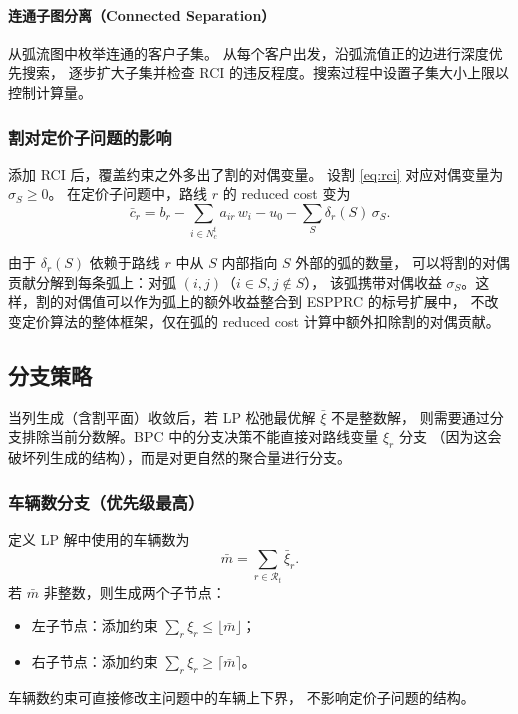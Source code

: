 \documentclass{article}
\begin{document}
\paragraph{连通子图分离（Connected Separation）}
从弧流图中枚举连通的客户子集。
从每个客户出发，沿弧流值正的边进行深度优先搜索，
逐步扩大子集并检查 RCI 的违反程度。搜索过程中设置子集大小上限以控制计算量。

\subsubsection{割对定价子问题的影响}

添加 RCI 后，覆盖约束之外多出了割的对偶变量。
设割 \eqref{eq:rci} 对应对偶变量为 $\sigma_S \ge 0$。
在定价子问题中，路线 $r$ 的 reduced cost 变为
\begin{equation}
\bar{c}_r = b_r - \sum_{i \in N_c^t} a_{ir}\,w_i - u_0 - \sum_{S} \delta_r(S)\,\sigma_S.
\label{eq:reduced_cost_with_cuts}
\end{equation}

由于 $\delta_r(S)$ 依赖于路线 $r$ 中从 $S$ 内部指向 $S$ 外部的弧的数量，
可以将割的对偶贡献分解到每条弧上：对弧 $(i,j)$（$i \in S, j \notin S$），
该弧携带对偶收益 $\sigma_S$。这样，割的对偶值可以作为弧上的额外收益整合到 ESPPRC 的标号扩展中，
不改变定价算法的整体框架，仅在弧的 reduced cost 计算中额外扣除割的对偶贡献。

\subsection{分支策略}
\label{sec:branching}

当列生成（含割平面）收敛后，若 LP 松弛最优解 $\bar\xi$ 不是整数解，
则需要通过分支排除当前分数解。BPC 中的分支决策不能直接对路线变量 $\xi_r$ 分支
（因为这会破坏列生成的结构），而是对更自然的聚合量进行分支。

\subsubsection{车辆数分支（优先级最高）}

定义 LP 解中使用的车辆数为
\begin{equation}
\bar{m} = \sum_{r \in \mathcal{R}_t} \bar\xi_r.
\end{equation}
若 $\bar{m}$ 非整数，则生成两个子节点：
\begin{itemize}[leftmargin=2em]
  \item 左子节点：添加约束 $\sum_r \xi_r \le \lfloor \bar{m} \rfloor$；
  \item 右子节点：添加约束 $\sum_r \xi_r \ge \lceil \bar{m} \rceil$。
\end{itemize}
车辆数约束可直接修改主问题中的车辆上下界，
不影响定价子问题的结构。
\end{document}
